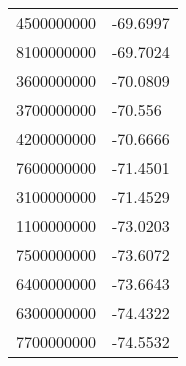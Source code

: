 \begin{tabular}{ll}
4500000000 & -69.6997 \\ 
8100000000 & -69.7024 \\ 
3600000000 & -70.0809 \\ 
3700000000 & -70.556 \\ 
4200000000 & -70.6666 \\ 
7600000000 & -71.4501 \\ 
3100000000 & -71.4529 \\ 
1100000000 & -73.0203 \\ 
7500000000 & -73.6072 \\ 
6400000000 & -73.6643 \\ 
6300000000 & -74.4322 \\ 
7700000000 & -74.5532 \\ 
\hline 
\end{tabular}